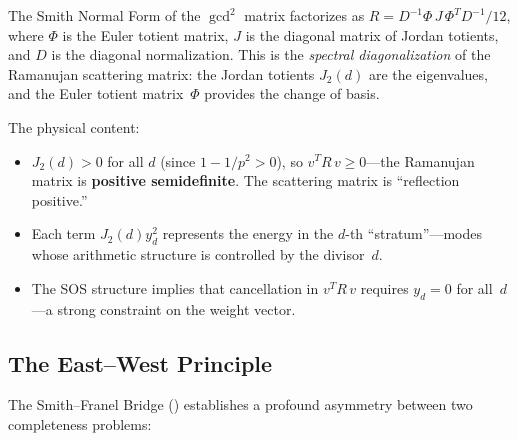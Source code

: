 \begin{correspondence}[Smith Normal Form = Spectral Diagonalization]
The Smith Normal Form of the $\gcd^2$ matrix factorizes as
$R = D^{-1} \Phi\, J\, \Phi^T D^{-1}/12$, where $\Phi$ is the
Euler totient matrix, $J$ is the diagonal matrix of Jordan
totients, and $D$ is the diagonal normalization. This is
the \emph{spectral diagonalization} of the Ramanujan scattering
matrix: the Jordan totients $J_2(d)$ are the eigenvalues,
and the Euler totient matrix~$\Phi$ provides the change of basis.

The physical content:
\begin{itemize}
  \item $J_2(d) > 0$ for all $d$ (since $1 - 1/p^2 > 0$), so
    $v^T R\, v \geq 0$---the Ramanujan matrix is
    \textbf{positive semidefinite}. The scattering matrix is
    ``reflection positive.''
  \item Each term $J_2(d) y_d^2$ represents the energy in the
    $d$-th ``stratum''---modes whose arithmetic structure is
    controlled by the divisor~$d$.
  \item The SOS structure implies that cancellation in $v^T R\, v$
    requires $y_d = 0$ for all~$d$---a strong constraint on the
    weight vector.
\end{itemize}
\end{correspondence}

\subsection{The East--West Principle}

The Smith--Franel Bridge () establishes
a profound asymmetry between two completeness problems:

